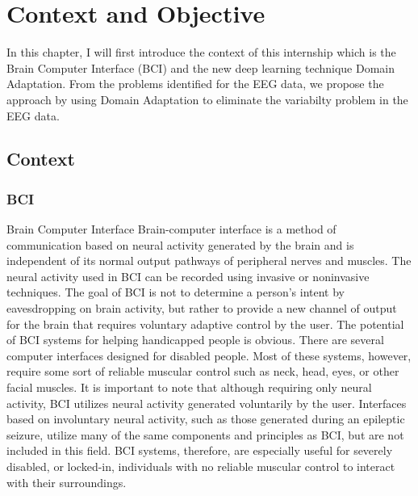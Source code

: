 
\chapter{Context and Objective} %

\label{Chapter2} %

In this chapter, I will first introduce the context of this internship which is the Brain Computer Interface (BCI) and the new deep learning technique Domain Adaptation. From the problems identified for the EEG data, we propose the approach by using Domain Adaptation to eliminate the variabilty problem in the EEG data.


\section{Context}


\subsection{BCI}{Brain Computer Interface}
Brain-computer interface is a method of communication based on neural activity generated by the brain and is independent of its normal output pathways of peripheral nerves and muscles. The neural activity used in BCI can be recorded using invasive or noninvasive techniques. The goal of BCI is not to determine a person's intent by eavesdropping on brain activity, but rather to provide a new channel of output for the brain that requires voluntary adaptive control by the user.\cite{wolpaw2000brain} The potential of BCI systems for helping handicapped people is obvious. There are several computer interfaces designed for disabled people.\cite{wickelgren2003brain} Most of these systems, however, require some sort of reliable muscular control such as neck, head, eyes, or other facial muscles. It is important to note that although requiring only neural activity, BCI utilizes neural activity generated voluntarily by the user. Interfaces based on involuntary neural activity, such as those generated during an epileptic seizure, utilize many of the same components and principles as BCI, but are not included in this field. BCI systems, therefore, are especially useful for severely disabled, or locked-in, individuals with no reliable muscular control to interact with their surroundings.

